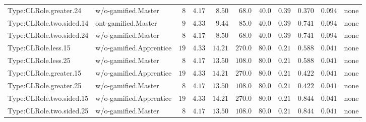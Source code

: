 \documentclass[6pt,a4paper]{article}
\begin{document}
{\begin{longtable}{llrrrrrrrrl}
Type:CLRole.greater.24&w/o-gamified.Master&$ 8$&$4.17$&$ 8.50$&$ 68.0$&$ 40.0$&$0.39$&$0.370$&$0.094$&none\tabularnewline
Type:CLRole.two.sided.14&ont-gamified.Master&$ 9$&$4.33$&$ 9.44$&$ 85.0$&$ 40.0$&$0.39$&$0.741$&$0.094$&none\tabularnewline
Type:CLRole.two.sided.24&w/o-gamified.Master&$ 8$&$4.17$&$ 8.50$&$ 68.0$&$ 40.0$&$0.39$&$0.741$&$0.094$&none\tabularnewline
Type:CLRole.less.15&w/o-gamified.Apprentice&$19$&$4.33$&$14.21$&$270.0$&$ 80.0$&$0.21$&$0.588$&$0.041$&none\tabularnewline
Type:CLRole.less.25&w/o-gamified.Master&$ 8$&$4.17$&$13.50$&$108.0$&$ 80.0$&$0.21$&$0.588$&$0.041$&none\tabularnewline
Type:CLRole.greater.15&w/o-gamified.Apprentice&$19$&$4.33$&$14.21$&$270.0$&$ 80.0$&$0.21$&$0.422$&$0.041$&none\tabularnewline
Type:CLRole.greater.25&w/o-gamified.Master&$ 8$&$4.17$&$13.50$&$108.0$&$ 80.0$&$0.21$&$0.422$&$0.041$&none\tabularnewline
\newpage
Type:CLRole.two.sided.15&w/o-gamified.Apprentice&$19$&$4.33$&$14.21$&$270.0$&$ 80.0$&$0.21$&$0.844$&$0.041$&none\tabularnewline
Type:CLRole.two.sided.25&w/o-gamified.Master&$ 8$&$4.17$&$13.50$&$108.0$&$ 80.0$&$0.21$&$0.844$&$0.041$&none\tabularnewline
\hline
\end{longtable}}
\end{document}
